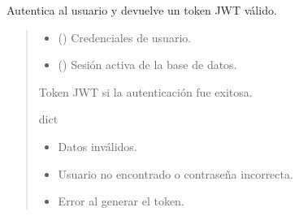 \documentclass[letterpaper,10pt,spanish]{sphinxmanual}
\begin{document}

\begin{fulllineitems}
\label{\detokenize{endpoints:main.login}}
\pysigstartsignatures
\pysiglinewithargsret
{}
{\sphinxparamcomma {}}
{}
\pysigstopsignatures
\sphinxAtStartPar
Autentica al usuario y devuelve un token JWT válido.
\begin{quote}\begin{description}
\begin{itemize}
\item {} 
\sphinxAtStartPar
{} ({\hyperref[\detokenize{modelos:main.UsuarioLogin}]{}}) \textendash{} Credenciales de usuario.

\item {} 
\sphinxAtStartPar
{} () \textendash{} Sesión activa de la base de datos.

\end{itemize}

\sphinxAtStartPar
Token JWT si la autenticación fue exitosa.

\sphinxAtStartPar
dict

\begin{itemize}
\item {} 
\sphinxAtStartPar
{} \textendash{} Datos inválidos.

\item {} 
\sphinxAtStartPar
{} \textendash{} Usuario no encontrado o contraseña incorrecta.

\item {} 
\sphinxAtStartPar
{} \textendash{} Error al generar el token.

\end{itemize}

\end{description}\end{quote}

\end{fulllineitems}
\end{document}
